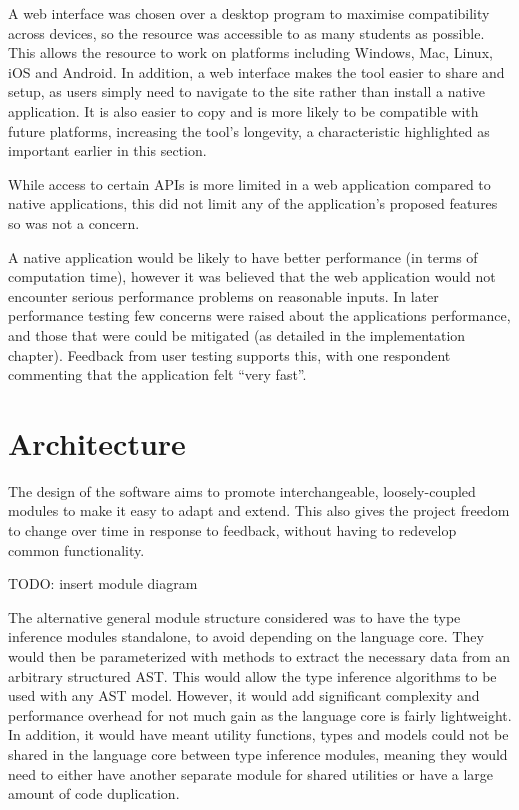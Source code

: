 \documentclass[a4paper,fleqn,twoside,12pt]{report}
\begin{document}
A web interface was chosen over a desktop program to maximise compatibility across devices, so the resource was accessible to as many students as possible. This allows the resource to work on platforms including Windows, Mac, Linux, iOS and Android. In addition, a web interface makes the tool easier to share and setup, as users simply need to navigate to the site rather than install a native application. It is also easier to copy and is more likely to be compatible with future platforms, increasing the tool’s longevity, a characteristic highlighted as important earlier in this section.

While access to certain APIs is more limited in a web application compared to native applications, this did not limit any of the application’s proposed features so was not a concern.

A native application would be likely to have better performance (in terms of computation time), however it was believed that the web application would not encounter serious performance problems on reasonable inputs. In later performance testing few concerns were raised about the applications performance, and those that were could be mitigated (as detailed in the implementation chapter). Feedback from user testing supports this, with one respondent commenting that the application felt “very fast”.
\section{Architecture}\label{id:h.l33hnjbawceh}
The design of the software aims to promote interchangeable, loosely-coupled modules to make it easy to adapt and extend. This also gives the project freedom to change over time in response to feedback, without having to redevelop common functionality.

TODO: insert module diagram

The alternative general module structure considered was to have the type inference modules standalone, to avoid depending on the language core. They would then be parameterized with methods to extract the necessary data from an arbitrary structured AST. This would allow the type inference algorithms to be used with any AST model. However, it would add significant complexity and performance overhead for not much gain as the language core is fairly lightweight. In addition, it would have meant utility functions, types and models could not be shared in the language core between type inference modules, meaning they would need to either have another separate module for shared utilities or have a large amount of code duplication.
\end{document}
